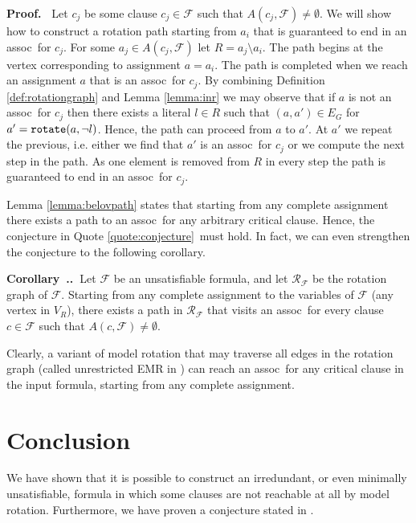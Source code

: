 \documentclass{article}
\newcounter{customenvs}[section]
\renewcommand{\thecustomenvs}{\thesection.\arabic{customenvs}}
\newcommand{\customenvbegin}[1]{\medskip\refstepcounter{customenvs}\noindent\textbf{#1~\thecustomenvs.~}}
\newcommand{\customenvend}{\medskip}
\newenvironment{corollary}{\customenvbegin{Corollary}}{\customenvend}
\newenvironment{proof}{\medskip\noindent\textbf{Proof.~}}{\medskip}
\newcommand{\keywfont}[1]{{\tt {#1}}}
\newcommand{\flip}{\keywfont{rotate}}
\newcommand{\flipfun}[2]{\flip({#1},{#2})}
\newcommand{\F}{\mathcal{F}}
\newcommand{\assoc}{assoc}
\begin{document}
\begin{proof}
Let $c_j$ be some clause $c_j \in \F$ such that $A(c_j,\F) \neq \emptyset$.
We will show how to construct a rotation path starting from $a_i$ that is guaranteed to end in an \assoc~for $c_j$.
For some $a_j \in A(c_j,\F)$ let $R=a_j \setminus a_i$.
The path begins at the vertex corresponding to assignment $a=a_i$.
The path is completed when we reach an assignment $a$ that is an \assoc~for $c_j$.
By combining Definition \ref{def:rotationgraph} and Lemma \ref{lemma:inr} we may observe that if $a$ is not an \assoc~for $c_j$ then there exists a literal $l \in R$ such that $(a, a') \in E_G$ for $a'=\flipfun{a}{\lnot l}$.
Hence, the path can proceed from $a$ to $a'$. 
At $a'$ we repeat the previous, i.e. either we find that $a'$ is an \assoc~for $c_j$ or we compute the next step in the path.
As one element is removed from $R$ in every step the path is guaranteed to end in an \assoc~for $c_j$.
\end{proof}

Lemma \ref{lemma:belovpath} states that starting from any complete assignment there exists a path to an \assoc~for any arbitrary critical clause. 
Hence, the conjecture in Quote \ref{quote:conjecture}~must hold.
In fact, we can even strengthen the conjecture to the following corollary.

\begin{corollary}\label{cor:belovstrong}Let $\F$ be an unsatisfiable formula, and let $\mathcal{R_F}$ be the rotation graph of $\F$. 
Starting from any complete assignment to the variables of $\F$ (any vertex in $V_R$), there exists a path in $\mathcal{R_F}$ that visits an \assoc~for every clause $c \in \F$ such that $A(c,\F) \neq \emptyset$.
\end{corollary}

Clearly, a variant of model rotation that may traverse all edges in the rotation graph (called unrestricted EMR in \cite{DBLP:journals/aicom/BelovLM12}) can reach an \assoc~for any critical clause in the input formula, starting from any complete assignment.

\section{Conclusion}
We have shown that it is possible to construct an irredundant, or even minimally unsatisfiable, formula in which some clauses are not reachable at all by model rotation.
Furthermore, we have proven a conjecture stated in \cite{DBLP:journals/aicom/BelovLM12}.


\end{document}
